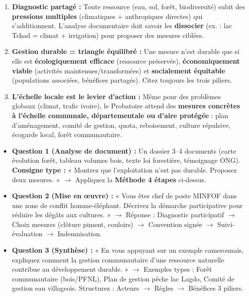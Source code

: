 \documentclass[11pt]{article}
\begin{document}
\begin{aretenir}
\begin{enumerate}
    \item \textbf{Diagnostic partagé :} Toute ressource (eau, sol, forêt, biodiversité) subit des \textbf{pressions multiples} (climatiques + anthropiques directes) qui s'additionnent. L'analyse documentaire doit savoir les \textbf{dissocier} (ex. : lac Tchad = climat + irrigation) pour proposer des mesures ciblées.
    \item \textbf{Gestion durable = triangle équilibré :} Une mesure n'est durable que si elle est \textbf{écologiquement efficace} (ressource préservée), \textbf{économiquement viable} (activités maintenues/transformées) et \textbf{socialement équitable} (populations associées, bénéfices partagés). Citez toujours les trois piliers.
    \item \textbf{L'échelle locale est le levier d'action :} Même pour des problèmes globaux (climat, trafic ivoire), le Probatoire attend des \textbf{mesures concrètes à l'échelle communale, départementale ou d'aire protégée} : plan d'aménagement, comité de gestion, quota, reboisement, culture répulsive, écogarde local, forêt communautaire.
\end{enumerate}
\end{aretenir}

\begin{savaistu}
\begin{itemize}
    \item \textbf{Question 1 (Analyse de document) :} Un dossier 3–4 documents (carte évolution forêt, tableau volumes bois, texte loi forestière, témoignage ONG). \textbf{Consigne type :} « Montrez que l'exploitation n'est pas durable. Proposez deux mesures. » $\rightarrow$ Appliquez la \textbf{Méthode 4 étapes} ci-dessus.
    \item \textbf{Question 2 (Mise en œuvre) :} « Vous êtes chef de poste MINFOF dans une zone de conflit homme-éléphant. Décrivez la démarche participative pour réduire les dégâts aux cultures. » $\rightarrow$ Réponse : Diagnostic participatif $\rightarrow$ Choix mesures (clôture piment, couloirs) $\rightarrow$ Convention signée $\rightarrow$ Suivi-évaluation $\rightarrow$ Indemnisation.
    \item \textbf{Question 3 (Synthèse) :} « En vous appuyant sur un exemple camerounais, expliquez comment la gestion communautaire d'une ressource naturelle contribue au développement durable. » $\rightarrow$ Exemples types : Forêt communautaire (bois/PFNL), Plan de gestion pêche lac Lagdo, Comité de gestion eau villageois. Structurez : Acteurs $\rightarrow$ Règles $\rightarrow$ Bénéfices 3 piliers.
\end{itemize}
\end{savaistu}
\end{document}

